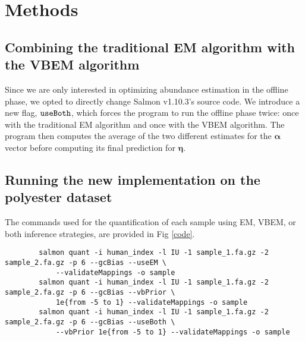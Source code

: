 \section{Methods}
\subsection{Combining the traditional EM algorithm with the VBEM algorithm}
Since we are only interested in optimizing abundance estimation in the offline phase, we opted to directly change Salmon v1.10.3’s 
source code. We introduce a new flag, $\mathtt{\-\-useBoth}$, which forces the program to run the offline phase twice: 
once with the traditional EM algorithm and once with the VBEM algorithm. 
The program then computes the average of the two different estimates for the $\pmb{\alpha}$ vector before computing its final 
prediction for $\pmb{\eta}$.

\subsection{Running the new implementation on the polyester dataset}
The commands used for the quantification of each sample using EM, VBEM, or both inference strategies, are provided in Fig \ref{code}.
\begin{figure*}[!t]%
    \centering
    {        
        \begin{verbatim}
        salmon quant -i human_index -l IU -1 sample_1.fa.gz -2 sample_2.fa.gz -p 6 --gcBias --useEM \
            --validateMappings -o sample
        salmon quant -i human_index -l IU -1 sample_1.fa.gz -2 sample_2.fa.gz -p 6 --gcBias --vbPrior \
            1e{from -5 to 1} --validateMappings -o sample
        salmon quant -i human_index -l IU -1 sample_1.fa.gz -2 sample_2.fa.gz -p 6 --gcBias --useBoth \
            --vbPrior 1e{from -5 to 1} --validateMappings -o sample
    \end{verbatim}
    }
    \caption{Commands used for the quantification of each sample using EM, VBEM, or both inference strategies, respectively.}
    \label{code}
\end{figure*}

